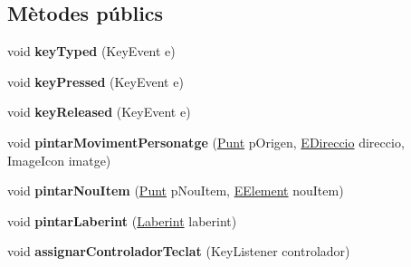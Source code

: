 \subsection*{Mètodes públics}
\begin{DoxyCompactItemize}
\item 
\hypertarget{classinterficie_1_1_p_laberint_afdd0ea49dc82b113d19fc10be10446f0}{void {\bfseries key\+Typed} (Key\+Event e)}\label{classinterficie_1_1_p_laberint_afdd0ea49dc82b113d19fc10be10446f0}

\item 
\hypertarget{classinterficie_1_1_p_laberint_a12bc88755622ba3dac447c9792dc1f83}{void {\bfseries key\+Pressed} (Key\+Event e)}\label{classinterficie_1_1_p_laberint_a12bc88755622ba3dac447c9792dc1f83}

\item 
\hypertarget{classinterficie_1_1_p_laberint_afc47dca7c563aca66e598c2a07cc11f9}{void {\bfseries key\+Released} (Key\+Event e)}\label{classinterficie_1_1_p_laberint_afc47dca7c563aca66e598c2a07cc11f9}

\item 
\hypertarget{classinterficie_1_1_p_laberint_a14c8ed9e53968b2f3b1c39c8e22b8ee6}{void {\bfseries pintar\+Moviment\+Personatge} (\hyperlink{classlogica_1_1_punt}{Punt} p\+Origen, \hyperlink{enumlogica_1_1enumeracions_1_1_e_direccio}{E\+Direccio} direccio, Image\+Icon imatge)}\label{classinterficie_1_1_p_laberint_a14c8ed9e53968b2f3b1c39c8e22b8ee6}

\item 
\hypertarget{classinterficie_1_1_p_laberint_ac189a5614b4be7b3380a41de5c56d05e}{void {\bfseries pintar\+Nou\+Item} (\hyperlink{classlogica_1_1_punt}{Punt} p\+Nou\+Item, \hyperlink{enumlogica_1_1enumeracions_1_1_e_element}{E\+Element} nou\+Item)}\label{classinterficie_1_1_p_laberint_ac189a5614b4be7b3380a41de5c56d05e}

\item 
\hypertarget{classinterficie_1_1_p_laberint_a8ceb1966667bf2a9ef6540701dae0bfe}{void {\bfseries pintar\+Laberint} (\hyperlink{classlogica_1_1laberints_1_1_laberint}{Laberint} laberint)}\label{classinterficie_1_1_p_laberint_a8ceb1966667bf2a9ef6540701dae0bfe}

\item 
\hypertarget{classinterficie_1_1_p_laberint_a5b19d218c21256e0ecfebc9b26c6d9df}{void {\bfseries assignar\+Controlador\+Teclat} (Key\+Listener controlador)}\label{classinterficie_1_1_p_laberint_a5b19d218c21256e0ecfebc9b26c6d9df}


\end{DoxyCompactItemize}
